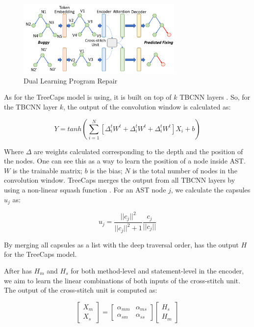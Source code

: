\begin{figure}[t]
	\centering
	\includegraphics[width=3.2in]{graphs/program_repair.png}
	\caption{Dual Learning Program Repair}
	\label{program-repair}
\end{figure}

As for the TreeCaps model \tool is using, it is built on top of $k$ TBCNN layers \cite{mou2014tbcnn}. So, for the TBCNN layer $k$, the output of the convolution window is calculated as:

\begin{equation}\label{eq:1}
	Y = tanh(\sum_{i=1}^{N}[\Delta^t_iW^t + \Delta^t_iW^t + \Delta^t_iW^t]X_i + b)
\end{equation}

Where $\Delta$ are weights calculated corresponding to the depth and the position of the nodes. One can see this as a
way to learn the position of a node inside AST. $W$ is the trainable matrix; $b$ is the bias; $N$ is the total number of nodes in the convolution window. TreeCaps merges the output from all TBCNN layers by using a non-linear squash
function \cite{sabour2017dynamic}. For an AST node $j$, we calculate the capsules $u_j$ as:

\begin{equation}\label{eq:2}
	u_j = \frac{||c_j||^2}{||c_j||^2+1}\frac{c_j}{||c_j||}
\end{equation}

By merging all capsules as a list with the deep traversal order, \tool has the output $H$ for the TreeCaps model.

After \tool has $H_m$ and $H_s$ for both method-level and statement-level in the encoder, we aim to learn the linear combinations of both inputs of the cross-stitch unit. The output of the cross-stitch unit is computed as:

\begin{equation}\label{eq:3}
	\begin{bmatrix}
		X_m\\
		X_s
	\end{bmatrix}
	=
	\begin{bmatrix}
		\alpha_{mm} &  \alpha_{ms} \\
		\alpha_{sm} &  \alpha_{ss}
	\end{bmatrix}
	\begin{bmatrix}
		H_s\\
		H_m
	\end{bmatrix}
\end{equation}

